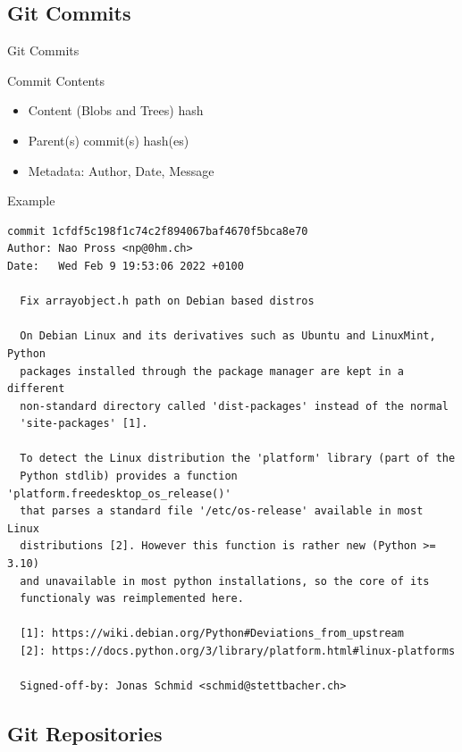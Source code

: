 \documentclass[xetex, handout]{beamer}
\begin{document}
\subsection{Git Commits}

\begin{frame}[fragile]{Git Commits}
  \begin{block}{Commit Contents}
    \begin{itemize}
      \item Content (Blobs and Trees) hash 
      \item Parent(s) commit(s) hash(es)
      \item Metadata: Author, Date, Message
    \end{itemize}
  \end{block}
  \begin{exampleblock}{Example}
  \centering\scriptsize
\begin{verbatim}
commit 1cfdf5c198f1c74c2f894067baf4670f5bca8e70
Author: Nao Pross <np@0hm.ch>
Date:   Wed Feb 9 19:53:06 2022 +0100

  Fix arrayobject.h path on Debian based distros
  
  On Debian Linux and its derivatives such as Ubuntu and LinuxMint, Python
  packages installed through the package manager are kept in a different
  non-standard directory called 'dist-packages' instead of the normal
  'site-packages' [1].
  
  To detect the Linux distribution the 'platform' library (part of the
  Python stdlib) provides a function 'platform.freedesktop_os_release()'
  that parses a standard file '/etc/os-release' available in most Linux
  distributions [2]. However this function is rather new (Python >= 3.10)
  and unavailable in most python installations, so the core of its
  functionaly was reimplemented here.
  
  [1]: https://wiki.debian.org/Python#Deviations_from_upstream
  [2]: https://docs.python.org/3/library/platform.html#linux-platforms
  
  Signed-off-by: Jonas Schmid <schmid@stettbacher.ch>
\end{verbatim}
  \end{exampleblock}
\end{frame}

\subsection{Git Repositories}
\end{document}
